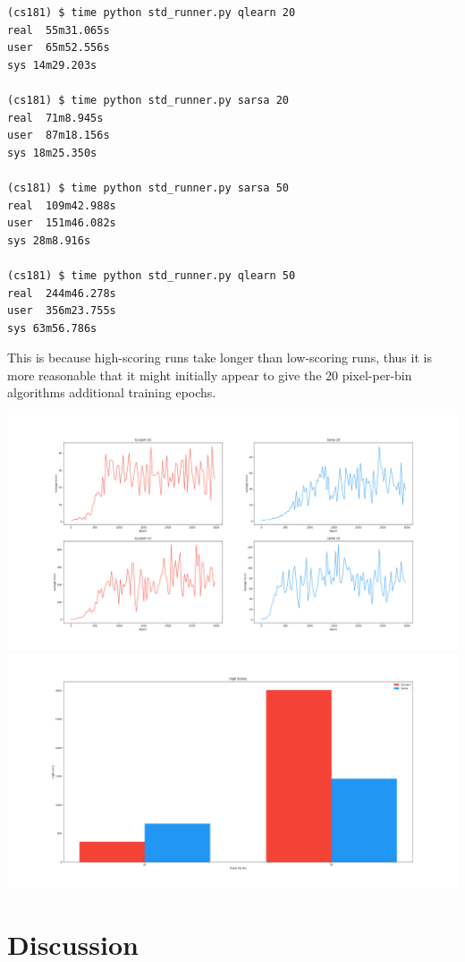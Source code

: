\documentclass[11pt]{article}
\begin{document}
\begin{lstlisting}
(cs181) $ time python std_runner.py qlearn 20
real  55m31.065s
user  65m52.556s
sys 14m29.203s

(cs181) $ time python std_runner.py sarsa 20
real  71m8.945s
user  87m18.156s
sys 18m25.350s

(cs181) $ time python std_runner.py sarsa 50
real  109m42.988s
user  151m46.082s
sys 28m8.916s

(cs181) $ time python std_runner.py qlearn 50
real  244m46.278s
user  356m23.755s
sys 63m56.786s
\end{lstlisting}
This is because high-scoring runs take longer than low-scoring runs, thus it is more reasonable that it might initially appear to give the 20 pixel-per-bin algorithms additional training epochs.

\includegraphics[width=20cm]{../figures/avg.png}\\
\includegraphics[width=20cm]{../figures/hiscores.png}\\

\section{Discussion}
\end{document}
